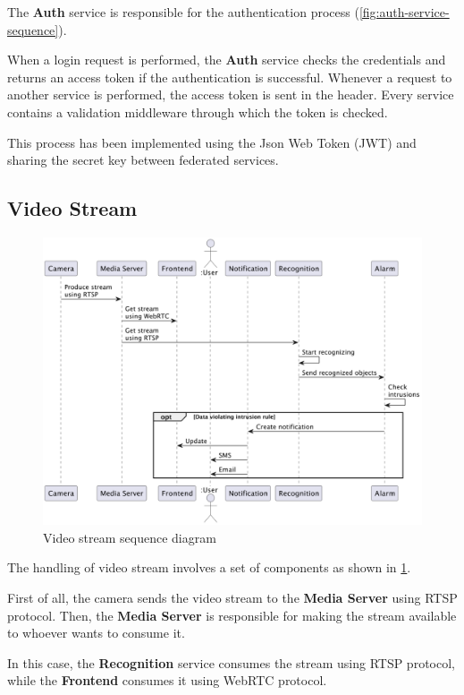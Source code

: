 \documentclass{scrartcl}
\begin{document}
    The \textbf{Auth} service is responsible for the authentication process (\cref{fig:auth-service-sequence}).

    When a login request is performed, the \textbf{Auth} service checks the credentials and returns an access token if the authentication is successful.
    Whenever a request to another service is performed, the access token is sent in the header.
    Every service contains a validation middleware through which the token is checked.

    This process has been implemented using the Json Web Token (JWT) and sharing the secret key between federated services.

    \subsection{Video Stream}
    \begin{figure}
        \centering
        \includegraphics[scale=0.5]{img/video-stream-sequence}
        \caption{Video stream sequence diagram}
        \label{fig:video-stream-sequence}
    \end{figure}

    The handling of video stream involves a set of components as shown in \cref{fig:video-stream-sequence}.

    First of all, the camera sends the video stream to the \textbf{Media Server} using RTSP protocol.
    Then, the \textbf{Media Server} is responsible for making the stream available to whoever wants to consume it.

    In this case, the  \textbf{Recognition} service consumes the stream using RTSP protocol, while the \textbf{Frontend} consumes it using WebRTC protocol.
\end{document}
